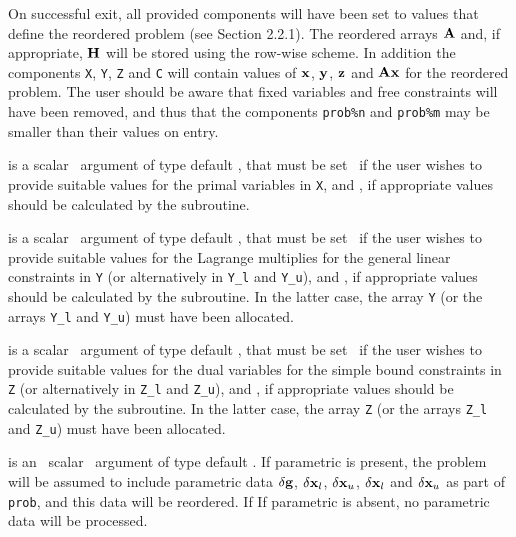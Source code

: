 \documentclass{galahad}
\begin{document}
\begin{description}

On successful exit, all provided components will have been set to values
that define the reordered problem (see Section 2.2.1). The reordered
arrays ${\mathbf{A}}$ and, if appropriate,  ${\mathbf{H}}$ will be stored using the row-wise
scheme. In addition the components
{\tt X}, {\tt Y}, {\tt Z} and {\tt C} will contain values of
${\mathbf{x}}$, ${\mathbf{y}}$, ${\mathbf{z}}$ and ${\mathbf{A}} {\mathbf{x}}$ for the reordered problem.
The user should be aware that fixed variables and free constraints will have
been removed, and thus that the components {\tt prob\%n} and {\tt prob\%m}
may be smaller than their values on entry.

 is a scalar \intentin\ argument of type default \logical, that
must be set \false\ if the user wishes to provide suitable values for the
primal variables in {\tt X}, and \true, if appropriate values should be
calculated by the subroutine.

 is a scalar \intentin\ argument of type default \logical, that
must be set \false\ if the user wishes to provide suitable values for the
Lagrange multiplies for the general linear constraints in {\tt Y}
(or alternatively in {\tt Y\_l} and {\tt Y\_u}),
and \true, if appropriate values should be calculated by the subroutine.
In the latter case, the array {\tt Y} (or the arrays {\tt Y\_l} and {\tt Y\_u})
must have been allocated.

 is a scalar \intentin\ argument of type default \logical, that
must be set \false\ if the user wishes to provide suitable values for the
dual variables for the simple bound constraints in {\tt Z}
(or alternatively in {\tt Z\_l} and {\tt Z\_u}), and \true,
if appropriate values should be calculated by the subroutine.
In the latter case, the array {\tt Z} (or the arrays {\tt Z\_l} and {\tt Z\_u})
must have been allocated.

is an \optional\ scalar \intentin\ argument of type default \logical.
If {parametric} is present, the problem will be assumed to include
parametric data $\delta {\mathbf{g}}$, $\delta {\mathbf{x}}_l$, $\delta {\mathbf{x}}_u$,
$\delta {\mathbf{x}}_l$ and $\delta {\mathbf{x}}_u$ as part of {\tt prob},
and this data will be reordered. If
If {parametric} is absent, no parametric data will be processed.

\end{description}
\end{document}
